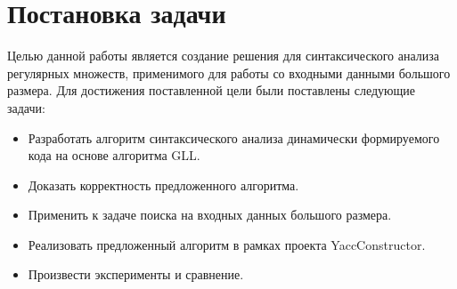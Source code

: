 \section{Постановка задачи}
Целью данной работы является создание решения для синтаксического анализа регулярных множеств, применимого для работы со входными данными большого размера. Для достижения поставленной цели были поставлены следующие задачи:

\begin{itemize}  
\item Разработать алгоритм синтаксического анализа динамически  формируемого кода на основе алгоритма GLL. 
\item Доказать корректность предложенного алгоритма.
\item Применить к задаче поиска на входных данных большого размера.
\item Реализовать предложенный алгоритм в рамках проекта YaccConstructor.
\item Произвести эксперименты и сравнение.
\end{itemize}
